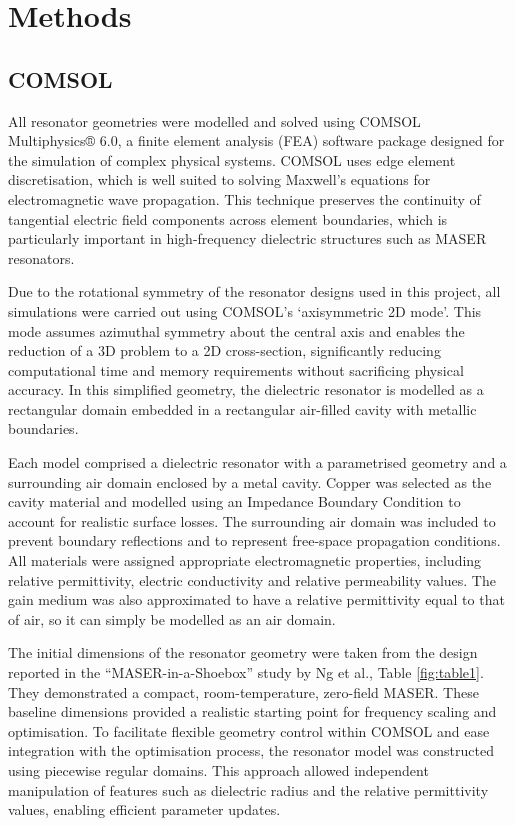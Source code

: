 \chapter{Methods}

\section{COMSOL}
\label{sec:section11}
All resonator geometries were modelled and solved using COMSOL Multiphysics®
6.0, a finite element analysis (FEA) software package designed for the
simulation of complex physical systems. COMSOL uses edge element discretisation,
which is well suited to solving Maxwell’s equations for electromagnetic wave
propagation. This technique preserves the continuity of tangential electric
field components across element boundaries, which is particularly important in
high-frequency dielectric structures such as MASER resonators.

Due to the rotational symmetry of the resonator designs used in this project,
all simulations were carried out using COMSOL’s ‘axisymmetric 2D mode’. This
mode assumes azimuthal symmetry about the central axis and enables the reduction
of a 3D problem to a 2D cross-section, significantly reducing computational time
and memory requirements without sacrificing physical accuracy. In this
simplified geometry, the dielectric resonator is modelled as a rectangular
domain embedded in a rectangular air-filled cavity with metallic boundaries.

Each model comprised a dielectric resonator with a parametrised geometry and a
surrounding air domain enclosed by a metal cavity. Copper was selected as the
cavity material and modelled using an Impedance Boundary Condition to account
for realistic surface losses. The surrounding air domain was included to prevent
boundary reflections and to represent free-space propagation conditions. All
materials were assigned appropriate electromagnetic properties, including
relative permittivity, electric conductivity and relative permeability values.
The gain medium was also approximated to have a relative permittivity equal to
that of air, so it can simply be modelled as an air domain.

The initial dimensions of the resonator geometry were taken from the design
reported in the “MASER-in-a-Shoebox” study by Ng et al.\autocite{ng2023maser},
Table \ref{fig:table1}. They demonstrated a compact, room-temperature,
zero-field MASER. These baseline dimensions provided a realistic starting point
for frequency scaling and optimisation. To facilitate flexible geometry control
within COMSOL and ease integration with the optimisation process, the resonator
model was constructed using piecewise regular domains. This approach allowed
independent manipulation of features such as dielectric radius and the relative
permittivity values, enabling efficient parameter updates.


